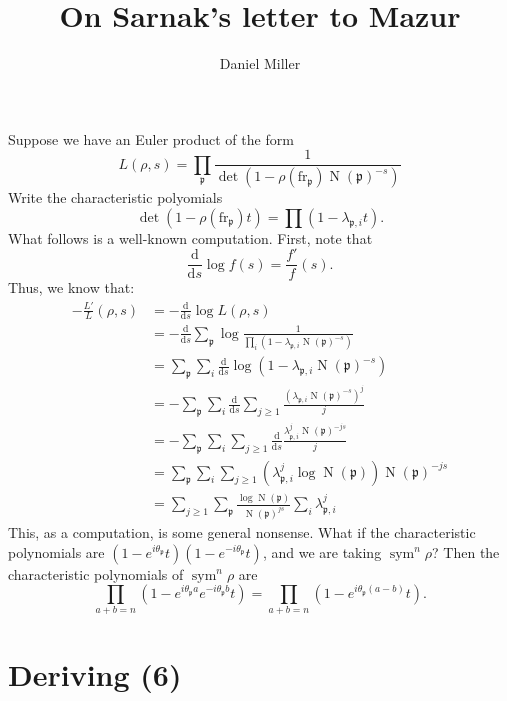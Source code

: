 \documentclass{article}
\title{On Sarnak's letter to Mazur}
\author{Daniel Miller}
\DeclareMathOperator{\norm}{N}
\DeclareMathOperator{\sym}{sym}
\newcommand{\fp}{\mathfrak{p}}
\newcommand{\dd}{\mathrm{d}}
\newcommand{\frob}{\mathrm{fr}}
\begin{document}
\maketitle





Suppose we have an Euler product of the form 
\[
	L(\rho,s) = \prod_\fp \frac{1}{\det(1-\rho(\frob_\fp) \norm (\fp)^{-s})}
\]
Write the characteristic polyomials 
\[
	\det(1-\rho(\frob_\fp) t) = \prod (1-\lambda_{\fp,i} t) .
\]
What follows is a well-known computation. First, note that 
\[
	\frac{\dd}{\dd s}\log f(s) = \frac{f'}{f}(s) .
\]
Thus, we know that: 
\begin{align*}
	-\frac{L'}{L}(\rho,s) 
		&= -\frac{\dd}{\dd s}\log L(\rho,s) \\
		&= -\frac{\dd}{\dd s} \sum_\fp \log \frac{1}{\prod_i (1-\lambda_{\fp,i} \norm(\fp)^{-s})} \\
		&= \sum_\fp \sum_i \frac{\dd}{\dd s} \log(1-\lambda_{\fp,i} \norm(\fp)^{-s}) \\
		&= -\sum_\fp \sum_i \frac{\dd}{\dd s} \sum_{j\geqslant 1} \frac{(\lambda_{\fp,i} \norm(\fp)^{-s})^j}{j} \\
		&= -\sum_\fp \sum_i \sum_{j\geqslant 1} \frac{\dd}{\dd s} \frac{\lambda_{\fp,i}^j \norm(\fp)^{-j s}}{j} \\
		&= \sum_\fp \sum_i \sum_{j\geqslant 1} (\lambda_{\fp,i}^j \log \norm(\fp)) \norm(\fp)^{-js} \\
		&= \sum_{j\geqslant 1} \sum_\fp \frac{\log \norm(\fp)}{\norm(\fp)^{j s}} \sum_i \lambda_{\fp,i}^j
\end{align*}
This, as a computation, is some general nonsense. What if the 
characteristic polynomials are $(1-e^{i\theta_\fp} t)(1-e^{-i\theta_\fp} t)$, 
and we are taking $\sym^n \rho$? Then the characteristic polynomials of 
$\sym^n\rho$ are 
\[
	\prod_{a+b=n} (1-e^{i \theta_\fp a} e^{-i\theta_\fp b} t)
		= \prod_{a+b=n} (1-e^{i\theta_\fp (a-b)} t) .
\]





\section{Deriving (6)}
\end{document}
